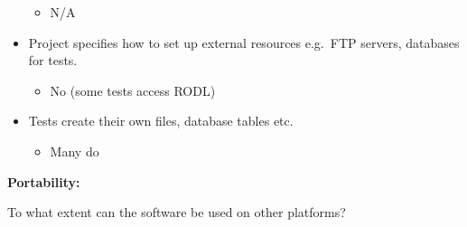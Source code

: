 \begin{itemize}
  \begin{itemize}
  \itemsep1pt\parskip0pt
  \item
    N/A
  \end{itemize}
\item
  Project specifies how to set up external resources e.g.~FTP servers,
  databases for tests.

  \begin{itemize}
  \itemsep1pt\parskip0pt
  \item
    No (some tests access RODL)
  \end{itemize}
\item
  Tests create their own files, database tables etc.

  \begin{itemize}
  \itemsep1pt\parskip0pt
  \item
    Many do
  \end{itemize}
\end{itemize}

\textbf{Portability:}

To what extent can the software be used on other platforms?

